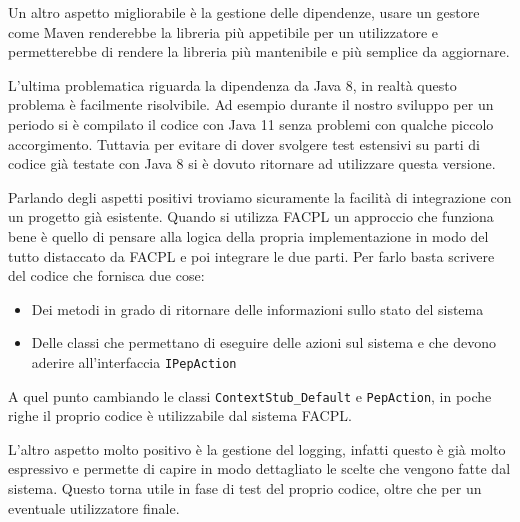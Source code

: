 Un altro aspetto migliorabile è la gestione delle dipendenze, usare un gestore come Maven renderebbe la libreria più appetibile per un utilizzatore e permetterebbe di rendere la libreria più mantenibile e più semplice da aggiornare.\par
L'ultima problematica riguarda la dipendenza da Java 8, in realtà questo problema è facilmente risolvibile. Ad esempio durante il nostro  sviluppo per un periodo si è compilato il codice con Java 11 senza problemi con qualche piccolo accorgimento. Tuttavia per evitare di dover svolgere test estensivi su parti di codice già testate con Java 8 si è dovuto ritornare ad utilizzare questa versione.\par
Parlando degli aspetti positivi troviamo sicuramente la facilità di integrazione con un progetto già esistente. Quando si utilizza FACPL un approccio che funziona bene è quello di pensare alla logica della propria implementazione in modo del tutto distaccato da FACPL e poi integrare le due parti. Per farlo basta scrivere del codice che fornisca due cose:
\begin{itemize}
    \item Dei metodi in grado di ritornare delle informazioni sullo stato del sistema
    \item Delle classi che permettano di eseguire delle azioni sul sistema e che devono aderire all'interfaccia \texttt{IPepAction}
\end{itemize}
A quel punto cambiando le classi \texttt{ContextStub\_Default} e \texttt{PepAction}, in poche righe il proprio codice è utilizzabile dal sistema FACPL.\par
L'altro aspetto molto positivo è la gestione del logging, infatti questo è già molto espressivo e permette di capire in modo dettagliato le scelte che vengono fatte dal sistema. Questo torna utile in fase di test del proprio codice, oltre che per un eventuale utilizzatore finale.\par


